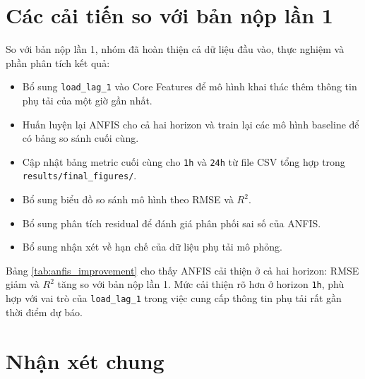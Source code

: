 \section{Các cải tiến so với bản nộp lần 1}

So với bản nộp lần 1, nhóm đã hoàn thiện cả dữ liệu đầu vào, thực nghiệm và phần phân tích kết quả:

\begin{itemize}[leftmargin=1.2cm]
  \item Bổ sung \texttt{load\_lag\_1} vào Core Features để mô hình khai thác thêm thông tin phụ tải của một giờ gần nhất.
  \item Huấn luyện lại ANFIS cho cả hai horizon và train lại các mô hình baseline để có bảng so sánh cuối cùng.
  \item Cập nhật bảng metric cuối cùng cho \texttt{1h} và \texttt{24h} từ file CSV tổng hợp trong \texttt{results/final\_figures/}.
  \item Bổ sung biểu đồ so sánh mô hình theo RMSE và $R^2$.
  \item Bổ sung phân tích residual để đánh giá phân phối sai số của ANFIS.
  \item Bổ sung nhận xét về hạn chế của dữ liệu phụ tải mô phỏng.
\end{itemize}

\begin{table}[H]
  \centering
  \caption{So sánh kết quả ANFIS trước và sau cải tiến}
  \label{tab:anfis_improvement}
\end{table}

Bảng \ref{tab:anfis_improvement} cho thấy ANFIS cải thiện ở cả hai horizon: RMSE giảm và $R^2$ tăng so với bản nộp lần 1. Mức cải thiện rõ hơn ở horizon \texttt{1h}, phù hợp với vai trò của \texttt{load\_lag\_1} trong việc cung cấp thông tin phụ tải rất gần thời điểm dự báo.

\section{Nhận xét chung}

